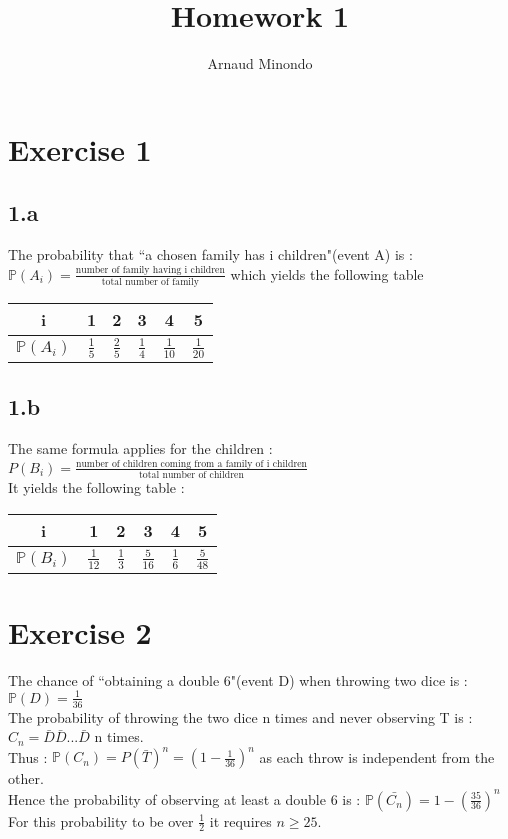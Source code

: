 \documentclass{article}
\title{Homework 1}
\author{Arnaud Minondo}
\begin{document}
    

    \maketitle


    \section*{Exercise 1}
    \subsection*{1.a}
    The probability that ``a chosen family has i children"(event A) is : 
    \\ 
    $\mathbb{P}(A_{i}) = \frac{\textrm{number of family having i children}}{\textrm{total number of family}}$ which yields the following table 
    \begin{tabular}{|c|c|c|c|c|c|}
        \hline
        i & 1 & 2 & 3 & 4 & 5 \\
        \hline
        $\mathbb{P}(A_{i})$ & $\frac{1}{5}$ & $\frac{2}{5}$ & $\frac{1}{4}$ & $\frac{1}{10}$ & $\frac{1}{20}$
        \\
        \hline
    \end{tabular}   
    \subsection*{1.b}
    The same formula applies for the children : $P(B_i) = \frac{\textrm{number of children coming from a family of i children}}{\textrm{total number of children}}$
    \\
    It yields the following table :
    \begin{tabular}{|c|c|c|c|c|c|}
        \hline
        i & 1 & 2 & 3 & 4 & 5 \\
        \hline
        $\mathbb{P}(B_i)$ & $\frac{1}{12}$ & $\frac{1}{3}$ & $\frac{5}{16}$ & $\frac{1}{6}$ & $\frac{5}{48}$ 
        \\
        \hline
    \end{tabular} 
    \section*{Exercise 2}
    The chance of ``obtaining a double 6"(event D) when throwing two dice is : $\mathbb{P}(D) = \frac{1}{36}$ 
    \\
    The probability of throwing the two dice n times and never observing T is : $C_n = \bar{D}\bar{D}... \bar{D}$ n times. 
    \\
    Thus : $\mathbb{P}(C_n) = P(\bar{T})^n = (1-\frac{1}{36})^n$ as each throw is independent from the other. 
    \\
    Hence the probability of observing at least a double 6 is : $\boxed{\mathbb{P}(\bar{C_n}) = 1 - (\frac{35}{36})^n }$
    \\
    For this probability to be over $\frac{1}{2}$ it requires $ n \geq 25 $.
\end{document}
